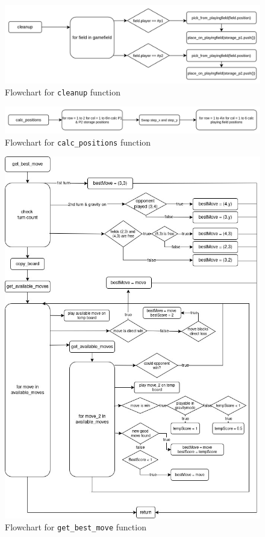 \documentclass{article}
\begin{document}
        \begin{figure}[htbp]
            \centering
            \includegraphics[width=\textwidth]{../media/cleanup.png}
            \caption{Flowchart for \texttt{cleanup} function}\label{fig:cleanup}
        \end{figure}

        \begin{figure}[htbp]
            \centering
            \includegraphics[width=\textwidth]{../media/calc_positions.png}
            \caption{Flowchart for \texttt{calc\_positions} function}\label{fig:calc_positions}
        \end{figure}

        \begin{figure}[htbp]
            \centering
            \includegraphics[width=\textwidth]{../media/get_best_move.jpeg}
            \caption{Flowchart for \texttt{get\_best\_move} function}\label{fig:get_best_move}
        \end{figure}
\end{document}

